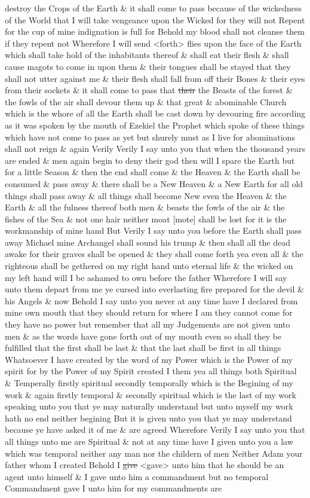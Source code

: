 destroy the Crops of the Earth \& it shall come to pass because of the wickedness of the World that I will take vengeance upon the Wicked for they will not Repent for the cup of mine indignation is full for Behold my blood shall not cleanse them if they repent not Wherefore I will send <forth> flies upon the face of the Earth which shall take hold of the inhabitants thereof \& shall eat their flesh \& shall cause magots to come in upon them \& their tongues shall be stayed that they shall not utter against me \& their flesh shall fall from off their Bones \& their eyes from their sockets \& it shall come to pass that \sout{their} the Beasts of the forest \& the fowls of the air shall devour them up \& that great \& abominable Church which is the whore of all the Earth shall be cast down by devouring fire according as it was spoken by the mouth of Ezekiel the Prophet which spoke of these things which have not come to pass as yet but shurely must as I live for abominations shall not reign \& again Verily Verily I say unto you that when the thousand years are ended \& men again begin to deny their god then will I spare the Earth but for a little Season \& then the end shall come \& the Heaven \& the Earth shall be consumed \& pass away \& there shall be a New Heaven \& a New Earth for all old things shall pass away \& all things shall become New even the Heaven \& the Earth \& all the fulness thereof both men \& beasts the fowls of the air \& the fishes of the Sea \& not one hair neither moat [mote] shall be lost for it is the workmanship of mine hand But Verily I say unto you before the Earth shall pass away Michael mine Archangel shall sound his trump \& then shall all the dead awake for their graves shall be opened \& they shall come forth yea even all \& the righteous shall be gethered on my right hand unto eternal life \& the wicked on my left hand will I be ashamed to own before the father Wherefore I will say unto them depart from me ye cursed into everlasting fire prepared for the devil \& his Angels \& now Behold I say unto you never at any time have I declared from mine own mouth that they should return for where I am they cannot come for they have no power but remember that all my Judgements are not given unto men \& as the words have gone forth out of my mouth even so shall they be fulfilled that the first shall be last \& that the last shall be first in all things Whatsoever I have created by the word of my Power which is the Power of my spirit for by the Power of my Spirit created I them yea all things both Spiritual \& Temperally firstly spiritual secondly temporally which is the Begining of my work \& again firstly temporal \& secondly spiritual which is the last of my work speaking unto you that ye may naturally understand but unto myself my work hath no end neither begining But it is given unto you that ye may understand because ye have asked it of me \& are agreed Wherefore Verily I say unto you that all things unto me are Spiritual \& not at any time have I given unto you a law which was temporal neither any man nor the childern of men Neither Adam your father whom I created Behold I \sout{give} <gave> unto him that he should be an agent unto himself \& I gave unto him a commandment but no temporal Commandment gave I unto him for my commandments are 